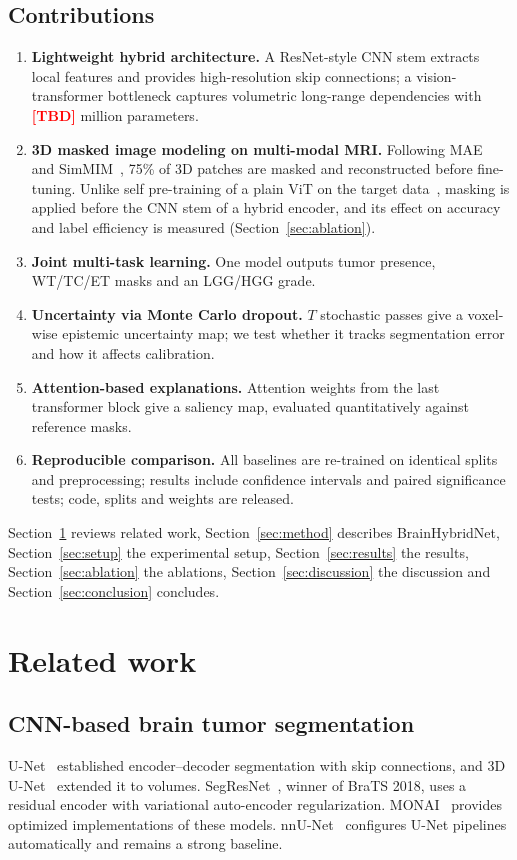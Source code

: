\documentclass[pdflatex,sn-mathphys-num]{sn-jnl}
\newcommand{\tbd}[1][]{\textcolor{red}{\textbf{[TBD#1]}}}
\begin{document}
\subsection{Contributions}
\begin{enumerate}
\item \textbf{Lightweight hybrid architecture.} A ResNet-style CNN stem extracts local features and provides high-resolution skip connections; a vision-transformer bottleneck captures volumetric long-range dependencies with \tbd{} million parameters.
\item \textbf{3D masked image modeling on multi-modal MRI.} Following MAE~\cite{he2022mae} and SimMIM~\cite{xie2022simmim}, 75\% of 3D patches are masked and reconstructed before fine-tuning. Unlike self pre-training of a plain ViT on the target data~\cite{zhou2023selfmae}, masking is applied before the CNN stem of a hybrid encoder, and its effect on accuracy and label efficiency is measured (Section~\ref{sec:ablation}).
\item \textbf{Joint multi-task learning.} One model outputs tumor presence, WT/TC/ET masks and an LGG/HGG grade.
\item \textbf{Uncertainty via Monte Carlo dropout.} $T$ stochastic passes give a voxel-wise epistemic uncertainty map; we test whether it tracks segmentation error and how it affects calibration.
\item \textbf{Attention-based explanations.} Attention weights from the last transformer block give a saliency map, evaluated quantitatively against reference masks.
\item \textbf{Reproducible comparison.} All baselines are re-trained on identical splits and preprocessing; results include confidence intervals and paired significance tests; code, splits and weights are released.
\end{enumerate}

Section~\ref{sec:related} reviews related work, Section~\ref{sec:method} describes BrainHybridNet, Section~\ref{sec:setup} the experimental setup, Section~\ref{sec:results} the results, Section~\ref{sec:ablation} the ablations, Section~\ref{sec:discussion} the discussion and Section~\ref{sec:conclusion} concludes.

\section{Related work}\label{sec:related}

\subsection{CNN-based brain tumor segmentation}
U-Net~\cite{ronneberger2015} established encoder--decoder segmentation with skip connections, and 3D U-Net~\cite{cicek2016} extended it to volumes. SegResNet~\cite{myronenko2019}, winner of BraTS 2018, uses a residual encoder with variational auto-encoder regularization. MONAI~\cite{cardoso2022monai} provides optimized implementations of these models. nnU-Net~\cite{isensee2021nnunet} configures U-Net pipelines automatically and remains a strong baseline.
\end{document}
